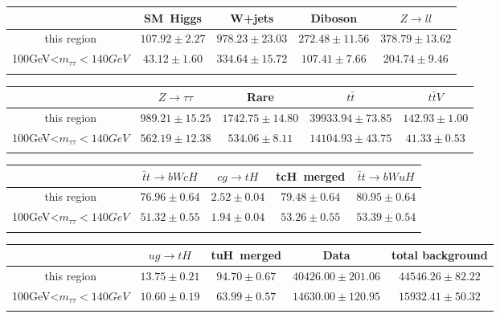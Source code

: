 \centering
\begin{tabular}{ccccc} \toprule\toprule
 & SM~Higgs & W+jets & Diboson & $Z\to ll$\\\midrule
this region & $107.92\pm2.27$ & $978.23\pm23.03$ & $272.48\pm11.56$ & $378.79\pm13.62$\\
100GeV<$m_{\tau\tau}<140GeV$ & $43.12\pm1.60$ & $334.64\pm15.72$ & $107.41\pm7.66$ & $204.74\pm9.46$\\
\bottomrule\bottomrule\\
\end{tabular}
\begin{tabular}{ccccc} \toprule\toprule
 & $Z\to \tau\tau$ & Rare & $t\bar{t}$ & $t\bar{t}V$\\\midrule
this region & $989.21\pm15.25$ & $1742.75\pm14.80$ & $39933.94\pm73.85$ & $142.93\pm1.00$\\
100GeV<$m_{\tau\tau}<140GeV$ & $562.19\pm12.38$ & $534.06\pm8.11$ & $14104.93\pm43.75$ & $41.33\pm0.53$\\
\bottomrule\bottomrule\\
\end{tabular}
\begin{tabular}{ccccc} \toprule\toprule
 & $\bar{t}t\to bWcH$ & $cg\to tH$ & tcH~merged & $\bar{t}t\to bWuH$\\\midrule
this region & $76.96\pm0.64$ & $2.52\pm0.04$ & $79.48\pm0.64$ & $80.95\pm0.64$\\
100GeV<$m_{\tau\tau}<140GeV$ & $51.32\pm0.55$ & $1.94\pm0.04$ & $53.26\pm0.55$ & $53.39\pm0.54$\\
\bottomrule\bottomrule\\
\end{tabular}
\begin{tabular}{ccccc} \toprule\toprule
 & $ug\to tH$ & tuH~merged & Data & total background\\\midrule
this region & $13.75\pm0.21$ & $94.70\pm0.67$ & $40426.00\pm201.06$ & $44546.26\pm82.22$\\
100GeV<$m_{\tau\tau}<140GeV$ & $10.60\pm0.19$ & $63.99\pm0.57$ & $14630.00\pm120.95$ & $15932.41\pm50.32$\\
\bottomrule\bottomrule\\
\end{tabular}
